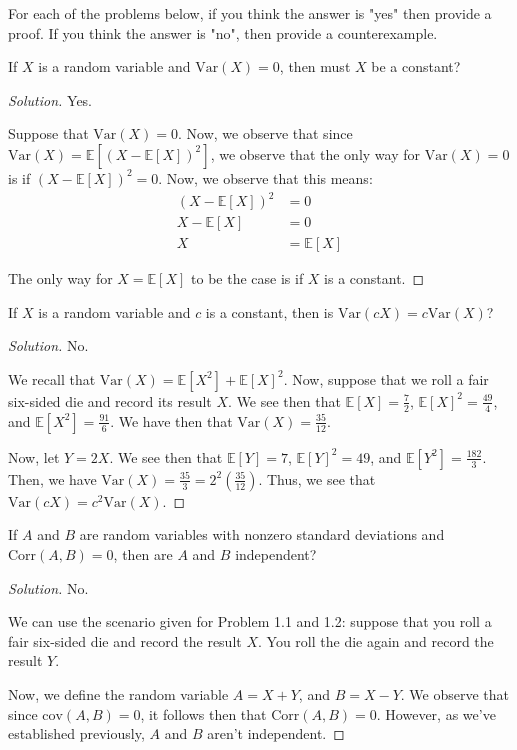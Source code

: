 \documentclass{article}
\newenvironment{solution}{\begin{proof}[Solution]}{\end{proof}}
\newcommand{\E}{\mathbb{E}}
\newcommand{\Var}{\mathrm{Var}}
\newcommand{\cov}{\mathrm{cov}}
\newcommand{\corr}{\mathrm{Corr}}
\begin{document}
For each of the problems below, if you think the answer is "yes" then provide a proof. If you think the answer is "no", then provide a counterexample.
\begin{hw}
	If $X$ is a random variable and $\Var (X) = 0$, then must $X$ be a constant?
\end{hw}
\begin{solution}
	Yes.
	
	Suppose that $\Var(X) = 0$. Now, we observe that since $\Var(X) = \E[(X - \E[X])^{2}]$, we observe that the only way for $\Var(X) = 0$ is if $(X - \E[X])^{2} = 0$. Now, we observe that this means:
	\begin{align*}
		(X - \E[X])^{2} &= 0 \\
		X - \E[X] &= 0 \\
		X &= \E[X]
	\end{align*}

	The only way for $X = \E[X]$ to be the case is if $X$ is a constant.
\end{solution}

\begin{hw}
	If $X$ is a random variable and $c$ is a constant, then is $\Var (cX) = c \Var (X)$?
\end{hw}
\begin{solution}
	No.
	
	We recall that $\Var(X) = \E[X^{2}] + \E[X]^{2}$. Now, suppose that we roll a fair six-sided die and record its result $X$. We see then that $\E[X] = \frac{7}{2}$, $\E[X]^{2} = \frac{49}{4}$, and $\E[X^{2}] = \frac{91}{6}$. We have then that $\Var(X) = \frac{35}{12}$.
	
	Now, let $Y = 2X$. We see then that $\E[Y] = 7$, $\E[Y]^{2} = 49$, and $\E[Y^{2}] = \frac{182}{3}$. Then, we have $\Var(X) = \frac{35}{3} = 2^{2}\left( \frac{35}{12} \right)$. Thus, we see that $\Var(cX) = c^{2} \Var(X)$.
\end{solution}

\begin{hw}
	If $A$ and $B$ are random variables with nonzero standard deviations and $\corr (A, B) = 0$, then are $A$ and $B$ independent?
\end{hw}
\begin{solution}
	No.
	
	We can use the scenario given for Problem 1.1 and 1.2: suppose that you roll a fair six-sided die and record the result $X$. You roll the die again and record the result $Y$. 
	
	Now, we define the random variable $A = X + Y$, and $B = X - Y$. We observe that since $\cov(A,B) = 0$, it follows then that $\corr(A,B) = 0$. However, as we've established previously, $A$ and $B$ aren't independent.
\end{solution}
\end{document}
